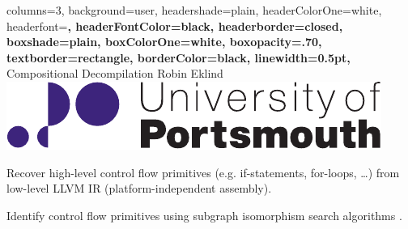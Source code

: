 \documentclass[a2paper,landscape,fontscale=0.35]{baposter}
\begin{document}
\begin{poster}{
	columns=3,
	background=user,
	headershade=plain,
	headerColorOne=white,
	headerfont=\Large\bfseries,
	headerFontColor=black,
	headerborder=closed,
	boxshade=plain,
	boxColorOne=white,
	boxopacity=.70,
	textborder=rectangle,
	borderColor=black,
	linewidth=0.5pt,
}
{}
{Compositional Decompilation}
{Robin Eklind}
{\includegraphics[height=0.05\textheight]{inc/logo.pdf}}

{
	Recover high-level control flow primitives (e.g. if-statements, for-loops, …) from low-level LLVM IR (platform-independent assembly).
}

{
	Identify control flow primitives using subgraph isomorphism search algorithms \cite{decomp_llvm}.

	\setlength{\intextsep}{5pt}
	\setlength{\abovecaptionskip}{5pt}

}
\end{poster}
\end{document}
